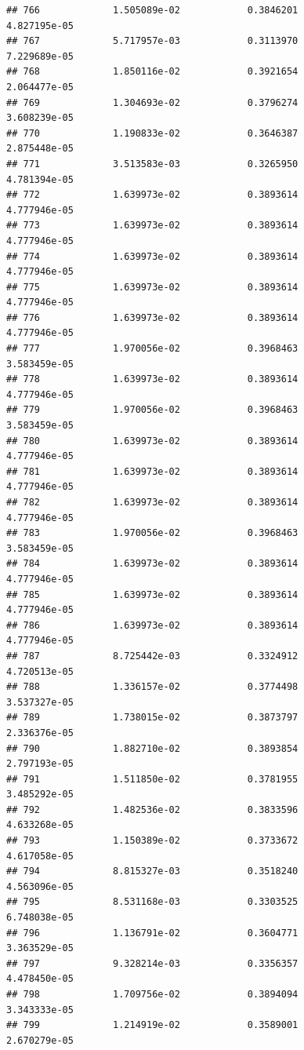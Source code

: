 \documentclass[
]{article}
\begin{document}
\begin{verbatim}
## 766             1.505089e-02            0.3846201            4.827195e-05
## 767             5.717957e-03            0.3113970            7.229689e-05
## 768             1.850116e-02            0.3921654            2.064477e-05
## 769             1.304693e-02            0.3796274            3.608239e-05
## 770             1.190833e-02            0.3646387            2.875448e-05
## 771             3.513583e-03            0.3265950            4.781394e-05
## 772             1.639973e-02            0.3893614            4.777946e-05
## 773             1.639973e-02            0.3893614            4.777946e-05
## 774             1.639973e-02            0.3893614            4.777946e-05
## 775             1.639973e-02            0.3893614            4.777946e-05
## 776             1.639973e-02            0.3893614            4.777946e-05
## 777             1.970056e-02            0.3968463            3.583459e-05
## 778             1.639973e-02            0.3893614            4.777946e-05
## 779             1.970056e-02            0.3968463            3.583459e-05
## 780             1.639973e-02            0.3893614            4.777946e-05
## 781             1.639973e-02            0.3893614            4.777946e-05
## 782             1.639973e-02            0.3893614            4.777946e-05
## 783             1.970056e-02            0.3968463            3.583459e-05
## 784             1.639973e-02            0.3893614            4.777946e-05
## 785             1.639973e-02            0.3893614            4.777946e-05
## 786             1.639973e-02            0.3893614            4.777946e-05
## 787             8.725442e-03            0.3324912            4.720513e-05
## 788             1.336157e-02            0.3774498            3.537327e-05
## 789             1.738015e-02            0.3873797            2.336376e-05
## 790             1.882710e-02            0.3893854            2.797193e-05
## 791             1.511850e-02            0.3781955            3.485292e-05
## 792             1.482536e-02            0.3833596            4.633268e-05
## 793             1.150389e-02            0.3733672            4.617058e-05
## 794             8.815327e-03            0.3518240            4.563096e-05
## 795             8.531168e-03            0.3303525            6.748038e-05
## 796             1.136791e-02            0.3604771            3.363529e-05
## 797             9.328214e-03            0.3356357            4.478450e-05
## 798             1.709756e-02            0.3894094            3.343333e-05
## 799             1.214919e-02            0.3589001            2.670279e-05

\end{verbatim}
\end{document}
